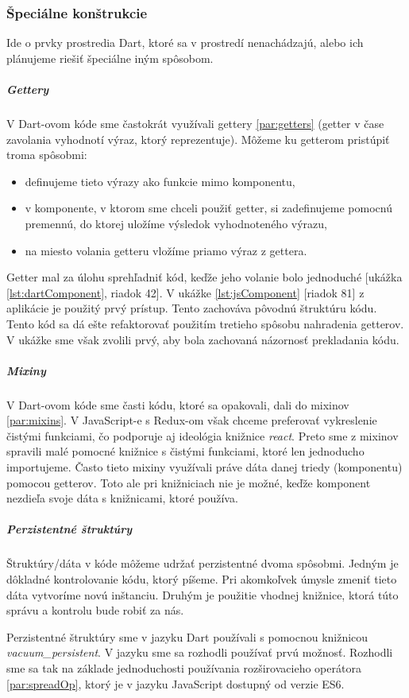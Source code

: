 

\subsubsection{Špeciálne konštrukcie}
Ide o prvky prostredia Dart, ktoré sa v prostredí \JS{} nenachádzajú, alebo ich plánujeme riešiť špeciálne iným spôsobom.

\subparagraph{Gettery}
V Dart-ovom kóde sme častokrát využívali gettery \ref{par:getters} (getter v čase zavolania vyhodnotí výraz, ktorý reprezentuje). Môžeme ku getterom pristúpiť troma spôsobmi: 
\begin{itemize}
  \item definujeme tieto výrazy ako funkcie mimo komponentu,
  \item v komponente, v ktorom sme chceli použiť getter, si zadefinujeme pomocnú premennú, do ktorej uložíme výsledok vyhodnoteného výrazu,
  \item na miesto volania getteru vložíme priamo výraz z gettera.
\end{itemize}

Getter mal za úlohu sprehľadniť kód, keďže jeho volanie bolo jednoduché [ukážka \ref{lst:dartComponent}, riadok 42].
V ukážke \ref{lst:jsComponent} [riadok 81] z aplikácie je použitý prvý prístup. Tento zachováva pôvodnú štruktúru kódu. Tento kód sa dá ešte refaktorovať použitím tretieho spôsobu nahradenia getterov. V ukážke sme však zvolili prvý, aby bola zachovaná názornosť prekladania kódu.

\subparagraph{Mixiny}
V Dart-ovom kóde sme časti kódu, ktoré sa opakovali, dali do mixinov \ref{par:mixins}. V JavaScript-e s Redux-om však chceme preferovať vykreslenie čistými funkciami, čo podporuje aj ideológia knižnice \emph{react}. Preto sme z mixinov spravili malé pomocné knižnice s čistými funkciami, ktoré len jednoducho importujeme. Často tieto mixiny využívali práve dáta danej triedy (komponentu) pomocou getterov. Toto ale pri knižniciach nie je možné, keďže komponent nezdieľa svoje dáta s knižnicami, ktoré používa.

\subparagraph{Perzistentné štruktúry}
Štruktúry/dáta v kóde môžeme udržať perzistentné dvoma spôsobmi. 
Jedným je dôkladné kontrolovanie kódu, ktorý píšeme. Pri akomkoľvek úmysle zmeniť tieto dáta vytvoríme novú inštanciu.
Druhým je použitie vhodnej knižnice, ktorá túto správu a kontrolu bude robiť za nás.

Perzistentné štruktúry sme v jazyku Dart používali s pomocnou knižnicou \emph{vacuum\_persistent}. V jazyku \JS{} sme sa rozhodli používať prvú možnosť. Rozhodli sme sa tak na základe jednoduchosti používania rozširovacieho operátora \ref{par:spreadOp}, ktorý je v jazyku JavaScript dostupný od verzie ES6.

